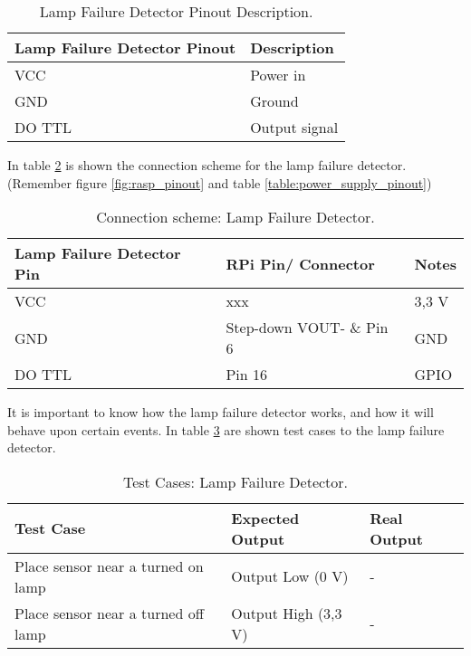 \begin{table}[H]
	\centering
	\begin{tabular}{|m{5cm}|m{6cm}|}
		\hline
		\textbf{Lamp Failure Detector Pinout} & \textbf{Description}
		\\\hline\hline
		
		VCC & Power in\\\hline
		GND & Ground\\\hline
		DO TTL & Output signal \\\hline
	\end{tabular}
	
	\caption{Lamp Failure Detector Pinout Description.}
	\label{table:LampFailPinout}
\end{table}


In table \ref{table:connect_lampfail} is shown the connection scheme for the lamp failure detector. (Remember figure \ref{fig:rasp_pinout} and table \ref{table:power_supply_pinout})


\begin{table}[H]
	\centering
	\begin{tabular}{|m{4cm}|m{5cm}|m{3cm}|}
		\hline
		\textbf{Lamp Failure Detector Pin} & \textbf{RPi Pin/ Connector} & \textbf{Notes} 
		\\\hline\hline
		
		VCC & xxx & 3,3 V
		\\\hline
		GND & Step-down VOUT- \& Pin 6 & GND
		\\\hline
		DO TTL & Pin 16 & GPIO
		\\\hline
	\end{tabular}
	
	\caption{Connection scheme: Lamp Failure Detector.}
	\label{table:connect_lampfail}
\end{table}


It is important to know how the lamp failure detector works, and how it will behave upon certain events. In table \ref{table:test_lampfail} are shown test cases to the lamp failure detector.

\begin{table}[H]
	\centering
	\resizebox{\columnwidth}{!}
	{
		\begin{tabular}{|m{3cm}|m{5cm}||m{5cm}|}
			\hline
			\textbf{Test Case} & \textbf{Expected Output} & \textbf{Real Output}
			\\\hline\hline
			Place sensor near a turned on lamp & Output Low (0 V) & - 
			\\\hline
			
			Place sensor near a turned off lamp  & Output High (3,3 V) & - 
			\\\hline
		\end{tabular}
	}
	\caption{Test Cases: Lamp Failure Detector.}
	\label{table:test_lampfail}
\end{table}


